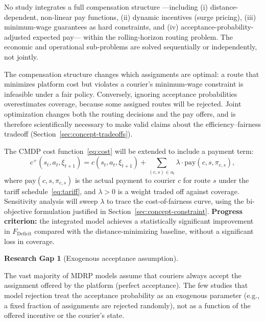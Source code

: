 \documentclass[12pt,a4paper]{report}
\newtheorem{gap}{Research Gap}
\begin{document}
No study integrates a full compensation structure ---including (i) distance-dependent, non-linear pay functions, (ii) dynamic incentives (surge pricing), (iii) minimum-wage guarantees as hard constraints, and (iv) acceptance-probability-adjusted expected pay--- within the rolling-horizon routing problem. The economic and operational sub-problems are solved sequentially or independently, not jointly.


The compensation structure changes which assignments are optimal: a route that minimizes platform cost but violates a courier's minimum-wage constraint is infeasible under a fair policy. Conversely, ignoring acceptance probabilities overestimates coverage, because some assigned routes will be rejected. Joint optimization changes both the routing decisions and the pay offers, and is therefore scientifically necessary to make valid claims about the efficiency--fairness tradeoff (Section~\ref{sec:concept-tradeoffs}).


The CMDP cost function~\eqref{eq:cost} will be extended to include a payment term:
\begin{equation}
    c^+(s_t, a_t, \xi_{t+1}) = c(s_t, a_t, \xi_{t+1}) + \sum_{(c,s)\in a_t}
    \lambda \cdot \text{pay}(c, s, \pi_{c,s}),
    \label{eq:cost_plus}
\end{equation}
where $\text{pay}(c,s,\pi_{c,s})$ is the actual payment to courier $c$ for route $s$ under the tariff schedule~\eqref{eq:tariff}, and $\lambda > 0$ is a weight traded off against coverage. Sensitivity analysis will sweep $\lambda$ to trace the cost-of-fairness curve, using the bi-objective formulation justified in Section~\ref{sec:concept-constraint}. \textbf{Progress criterion:} the integrated model achieves a statistically significant improvement in $F_{\text{Deficit}}$ compared with the distance-minimizing baseline, without a significant loss in coverage.


\begin{gap}[Exogenous acceptance assumption]
\label{gap:4}
\end{gap}
\hfill


The vast majority of MDRP models assume that couriers always accept the assignment offered by the platform (perfect acceptance). The few studies that model rejection
\citep{reyes2018meal,wen2010dynamic,bozanta2022courier} treat the acceptance probability as an exogenous parameter (e.g., a fixed fraction of assignments are rejected randomly), not as a function of the offered incentive or the courier's state.
\end{document}
